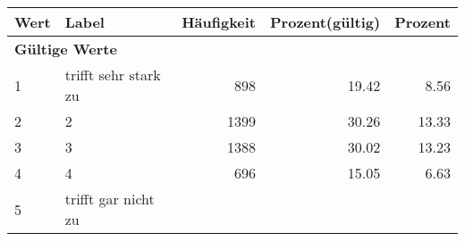      \begin{longtable}{lXrrr}
     \toprule
     \textbf{Wert} & \textbf{Label} & \textbf{Häufigkeit} & \textbf{Prozent(gültig)} & \textbf{Prozent} \\
     \endhead
     \midrule
     \multicolumn{5}{l}{\textbf{Gültige Werte}}\\

     1 &
     \multicolumn{1}{X}{ trifft sehr stark zu   } &


       \num{898} &
       \num[round-mode=places,round-precision=2]{19,42} &
         \num[round-mode=places,round-precision=2]{8,56} \\

     2 &
     \multicolumn{1}{X}{ 2   } &


       \num{1399} &
       \num[round-mode=places,round-precision=2]{30,26} &
         \num[round-mode=places,round-precision=2]{13,33} \\

     3 &
     \multicolumn{1}{X}{ 3   } &


       \num{1388} &
       \num[round-mode=places,round-precision=2]{30,02} &
         \num[round-mode=places,round-precision=2]{13,23} \\

     4 &
     \multicolumn{1}{X}{ 4   } &


       \num{696} &
       \num[round-mode=places,round-precision=2]{15,05} &
         \num[round-mode=places,round-precision=2]{6,63} \\

     5 &
     \multicolumn{1}{X}{ trifft gar nicht zu   } &



\end{longtable}
